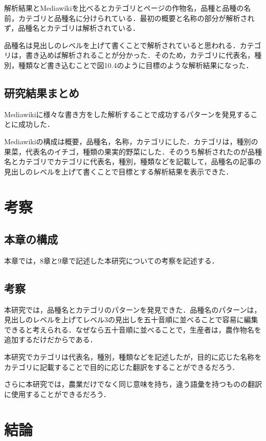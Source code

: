 \clearpage

解析結果とMediawikiを比べるとカテゴリとページの作物名，品種と品種の名前，カテゴリと品種名に分けられている．最初の概要と名称の部分が解析されず，品種名とカテゴリは解析されている．

品種名は見出しのレベルを上げて書くことで解析されていると思われる．カテゴリは，書き込めば解析されることが分かった．そのため，カテゴリに代表名，種別，種類など書き込むことで図10.4のように目標のような解析結果になった．


\section{研究結果まとめ}
Mediawikiに様々な書き方をした解析することで成功するパターンを発見することに成功した．

Mediawikiの構成は概要，品種名，名称，カテゴリにした．カテゴリは，種別の果菜，代表名のイチゴ，種類の果実的野菜にした．そのうち解析されたのが品種名とカテゴリでカテゴリに代表名，種別，種類などを記載して，品種名の記事の見出しのレベルを上げて書くことで目標とする解析結果を表示できた．



\chapter{考察}
\section{本章の構成}
本章では，8章と9章で記述した本研究についての考察を記述する．

\section{考察}
本研究では，品種名とカテゴリのパターンを発見できた．品種名のパターンは，見出しのレベルを上げてレベル3の見出しを五十音順に並べることで容易に編集できると考えられる．なぜなら五十音順に並べることで，生産者は，農作物名を追加するだけだからである．

本研究でカテゴリは代表名，種別，種類などを記述したが，目的に応じた名称をカテゴリに記載することで目的に応じた翻訳をすることができるだろう．

さらに本研究では，農業だけでなく同じ意味を持ち，違う語彙を持つものの翻訳に使用することができるだろう．


\chapter{結論}
